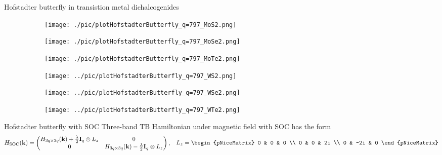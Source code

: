 \documentclass[aspectratio=169,compress,x11names]{beamer}
\begin{document}
	\begin{frame}{Hofstadter butterfly in transistion metal dichalcogenides}
		\begin{figure}
			\begin{subfigure}[b]{0.3\linewidth}
				\centering
				\texttt{[image: ./pic/plotHofstadterButterfly\_q=797\_MoS2.png]}
			\end{subfigure}
			\begin{subfigure}[b]{0.3\linewidth}
				\centering
				\texttt{[image: ./pic/plotHofstadterButterfly\_q=797\_MoSe2.png]}
			\end{subfigure}
			\begin{subfigure}[b]{0.3\linewidth}
				\centering
				\texttt{[image: ./pic/plotHofstadterButterfly\_q=797\_MoTe2.png]}
			\end{subfigure}
			\begin{subfigure}[b]{0.3\linewidth}
				\centering
				\texttt{[image: ../pic/plotHofstadterButterfly\_q=797\_WS2.png]}
			\end{subfigure}
			\begin{subfigure}[b]{0.3\linewidth}
				\centering
				\texttt{[image: ../pic/plotHofstadterButterfly\_q=797\_WSe2.png]}
			\end{subfigure}
			\begin{subfigure}[b]{0.3\linewidth}
				\centering
				\texttt{[image: ../pic/plotHofstadterButterfly\_q=797\_WTe2.png]}
			\end{subfigure}
		\end{figure}
	\end{frame}
	\begin{frame}{Hofstadter butterfly with SOC}
		Three-band TB Hamiltonian under magnetic field with SOC has the form
		\begin{equation}
			\begin{aligned}
				H_{\text{SOC}}(\mathbf{k})
				& =
				\begin{pmatrix}
					H_{3q \times 3q}(\mathbf{k}) + \frac{\lambda}{2} \mathbf{I}_{q} \otimes L_{z} & 0                                                      \\
					0                                                      & H_{3q \times 3q}(\mathbf{k}) - \frac{\lambda}{2} \mathbf{I}_{q} \otimes L_{z}
				\end{pmatrix},
			\end{aligned}
			\begin{aligned}
				L_{z}
				=
				\begin{pNiceMatrix}
					0 & 0   & 0  \\
					0 & 0   & 2i \\
					0 & -2i & 0
				\end{pNiceMatrix}
			\end{aligned}
		\end{equation}
	\end{frame}
\end{document}
